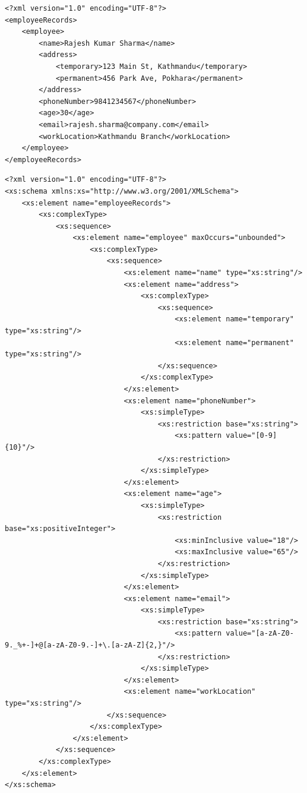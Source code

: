 \documentclass[a4paper,12pt]{article}
\begin{document}
\lstset{language=XML}
\begin{lstlisting}
<?xml version="1.0" encoding="UTF-8"?>
<employeeRecords>
    <employee>
        <name>Rajesh Kumar Sharma</name>
        <address>
            <temporary>123 Main St, Kathmandu</temporary>
            <permanent>456 Park Ave, Pokhara</permanent>
        </address>
        <phoneNumber>9841234567</phoneNumber>
        <age>30</age>
        <email>rajesh.sharma@company.com</email>
        <workLocation>Kathmandu Branch</workLocation>
    </employee>
</employeeRecords>
\end{lstlisting}

\lstset{language=XML}
\begin{lstlisting}
<?xml version="1.0" encoding="UTF-8"?>
<xs:schema xmlns:xs="http://www.w3.org/2001/XMLSchema">
    <xs:element name="employeeRecords">
        <xs:complexType>
            <xs:sequence>
                <xs:element name="employee" maxOccurs="unbounded">
                    <xs:complexType>
                        <xs:sequence>
                            <xs:element name="name" type="xs:string"/>
                            <xs:element name="address">
                                <xs:complexType>
                                    <xs:sequence>
                                        <xs:element name="temporary" type="xs:string"/>
                                        <xs:element name="permanent" type="xs:string"/>
                                    </xs:sequence>
                                </xs:complexType>
                            </xs:element>
                            <xs:element name="phoneNumber">
                                <xs:simpleType>
                                    <xs:restriction base="xs:string">
                                        <xs:pattern value="[0-9]{10}"/>
                                    </xs:restriction>
                                </xs:simpleType>
                            </xs:element>
                            <xs:element name="age">
                                <xs:simpleType>
                                    <xs:restriction base="xs:positiveInteger">
                                        <xs:minInclusive value="18"/>
                                        <xs:maxInclusive value="65"/>
                                    </xs:restriction>
                                </xs:simpleType>
                            </xs:element>
                            <xs:element name="email">
                                <xs:simpleType>
                                    <xs:restriction base="xs:string">
                                        <xs:pattern value="[a-zA-Z0-9._%+-]+@[a-zA-Z0-9.-]+\.[a-zA-Z]{2,}"/>
                                    </xs:restriction>
                                </xs:simpleType>
                            </xs:element>
                            <xs:element name="workLocation" type="xs:string"/>
                        </xs:sequence>
                    </xs:complexType>
                </xs:element>
            </xs:sequence>
        </xs:complexType>
    </xs:element>
</xs:schema>
\end{lstlisting}
\end{document}

